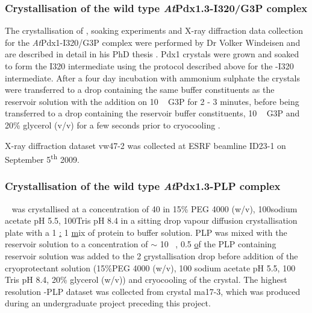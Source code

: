 \subsubsection{Crystallisation of the wild type \textit{At}Pdx1.3-I320/G3P complex}
The crystallisation of \atpdx, soaking experiments and X-ray diffraction data collection for the \textit{At}Pdx1-I320/G3P complex were performed by Dr Volker Windeisen and are described in detail in his PhD thesis \cite{Windeisen2013}. Pdx1 crystals were grown and soaked to form the I320 intermediate using the protocol described above for the \atpdx -I320 intermediate. After a four day incubation with ammonium sulphate the crystals were transferred to a drop containing the same buffer constituents as the reservoir solution with the addition on 10 \si{\milli\molar} G3P for 2 - 3 minutes, before being transferred to a drop containing the reservoir buffer constituents, 10 \si{\milli\molar} G3P and 20\% glycerol (v/v) for a few seconds prior to cryocooling \cite{Windeisen2013}.    

X-ray diffraction dataset vw47-2 was collected at ESRF beamline ID23-1 on September 5\textsuperscript{th} 2009. %

		\subsubsection{Crystallisation of the wild type \textit{At}Pdx1.3-PLP complex}\label{sec:PLP_soak}
\atpdx~ was crystallised at a concentration of 40 \mgml in 15\% PEG 4000 (w/v), 100\mM sodium acetate pH 5.5, 100\mM Tris pH 8.4 in a sitting drop vapour diffusion crystallisation plate with a 1 \ul : 1 \ul mix of protein to buffer solution. PLP was mixed with the reservoir solution to a concentration of $\sim$ 10 \si{\milli\molar}, 0.5 \ul of the PLP containing reservoir solution was added to the 2 \ul crystallisation drop before addition of the cryoprotectant solution (15\%PEG 4000 (w/v), 100 \mM sodium acetate pH 5.5, 100 \mM Tris pH 8.4, 20\% glycerol (w/v)) and cryocooling of the crystal. The highest resolution \atpdx -PLP dataset was collected from crystal ma17-3, which was produced during an undergraduate project preceding this project. 

